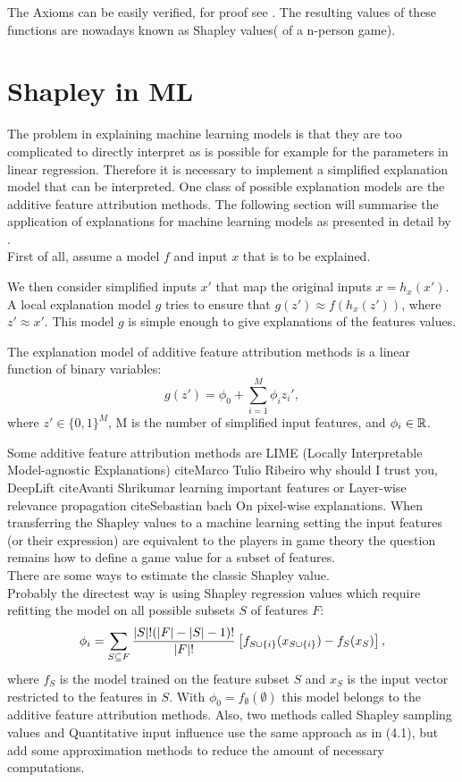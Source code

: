 The Axioms can be easily verified, for proof see \cite{shapley-1952}. 
The resulting values of these functions are nowadays known as Shapley values( of a n-person game).

\section{Shapley in ML}
The problem in explaining machine learning models is that they are too complicated to directly interpret as is possible for example for the parameters in linear regression. 
Therefore it is necessary to implement a simplified explanation model that can be interpreted. One class of possible explanation models are the additive feature attribution methods. The following section will summarise the application of explanations for machine learning models as presented in detail by \cite{lundberg-2017}. \\
First of all, assume a model $f$ and input $x$ that is to be explained.

We then consider simplified inputs $x'$ that map the original inputs $x=h_x(x')$. A local explanation model $g$ tries to ensure that $g(z')\approx f(h_x(z'))$, where $z'\approx x'$. This model $g$ is simple enough to give explanations of the features values.

\begin{definition}
   The explanation model of additive feature attribution methods is a linear function of binary variables: $$g(z') = \phi_0 + \sum_{i=1}^M \phi_i z_i',$$ where $z'\in\{0,1\}^M$, M is the number of simplified input features, and $\phi_i\in\mathbb{R}$.
\end{definition}
Some additive feature attribution methods are LIME (Locally Interpretable Model-agnostic Explanations) cite{Marco Tulio Ribeiro why should I trust you}, DeepLift cite{Avanti Shrikumar learning important features} or Layer-wise relevance propagation cite{Sebastian bach On pixel-wise explanations}. 
When transferring the Shapley values to a machine learning setting the input features (or their expression) are equivalent to the players in game theory the question remains how to define a game value for a subset of features.\\
There are some ways to estimate the classic Shapley value. \\
Probably the directest way is using Shapley regression values which require refitting the model on all possible subsets $S$ of features $F$:
\begin{align}
    \phi_i = \sum _{S\subseteq F} \frac{\left\lvert S \right\lvert!(\left\lvert F \right\lvert-\left\lvert S \right\lvert-1)!}{\left\lvert F \right\lvert!}\left[f_{S\cup \{i\}}(x_{S\cup \{i\}})-f_S(x_S)\right],
\end{align}
where $f_S$ is the model trained on the feature subset $S$ and $x_S$ is the input vector restricted to the features in $S$. With $\phi_0= f_{\emptyset}(\emptyset)$ this model belongs to the additive feature attribution methods. 
Also, two methods called Shapley sampling values and Quantitative input influence use the same approach as in (4.1), but add some approximation methods to reduce the amount of necessary computations.


